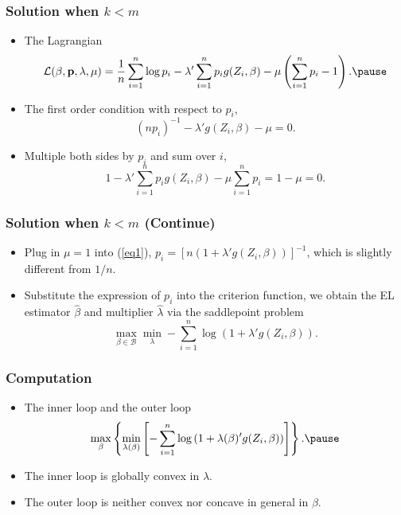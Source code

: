 \documentclass{beamer}
\begin{document}
\begin{frame}
\frametitle{Solution when \(k<m\)}

\begin{itemize}
\item The Lagrangian
\[ 
\mathcal{L}(\beta,\mathbf{p},\lambda,\mu)=\frac{1}{n} \sum_{i=1}^n \log p_i 
- \lambda' \sum_{i=1}^n p_i g(Z_i,\beta)
- \mu \left( \sum_{i=1}^n p_i - 1 \right).\pause
\]
\item The first order condition with respect to \(p_i\),
\begin{equation}
(np_i)^{-1} - \lambda' g(Z_i, \beta) - \mu = 0. \label{eq1}
\end{equation} \pause
\item Multiple both sides by $p_i$ and sum over \(i\),
\begin{displaymath}
1 - \lambda' \sum_{i=1}^n p_i g(Z_i, \beta) - \mu \sum_{i=1}^n p_i =1 -\mu=0.
\end{displaymath} 
 
\end{itemize}

\end{frame}





\begin{frame}
\frametitle{Solution when \(k<m\) (Continue)}
\begin{itemize}
\item Plug in $\mu = 1$ into (\ref{eq1}),  $p_i = [n(1+\lambda'g(Z_i, \beta))]^{-1}$,
which is slightly different from \(1/n\). 
\item Substitute the expression of \(p_i \) into the criterion function,
we obtain the EL estimator \(\widehat{\beta} \) and multiplier \(\widehat{\lambda}\)
 via the \alert{saddlepoint problem}
 \[
 \max_{\beta \in \mathcal{B}  } \min_{\lambda} -
 \sum_{i=1}^n \log \left(1 +\lambda' g(Z_i,\beta) \right).
 \]

\end{itemize}
\end{frame}






\begin{frame}
\frametitle{Computation}
\begin{itemize}
\item The inner loop and the outer loop
 \[
 \max_{\beta} \left\{ \min_{\lambda(\beta)} \left[ - 
 \sum_{i=1}^n \log \left(1 +\lambda(\beta)' g(Z_i,\beta) \right) \right] \right\}. \pause
 \]
 \item The inner loop is globally convex in \(\lambda\).
 \item The outer loop is neither convex nor concave in general in \(\beta\).
\end{itemize}
\end{frame}
\end{document}
